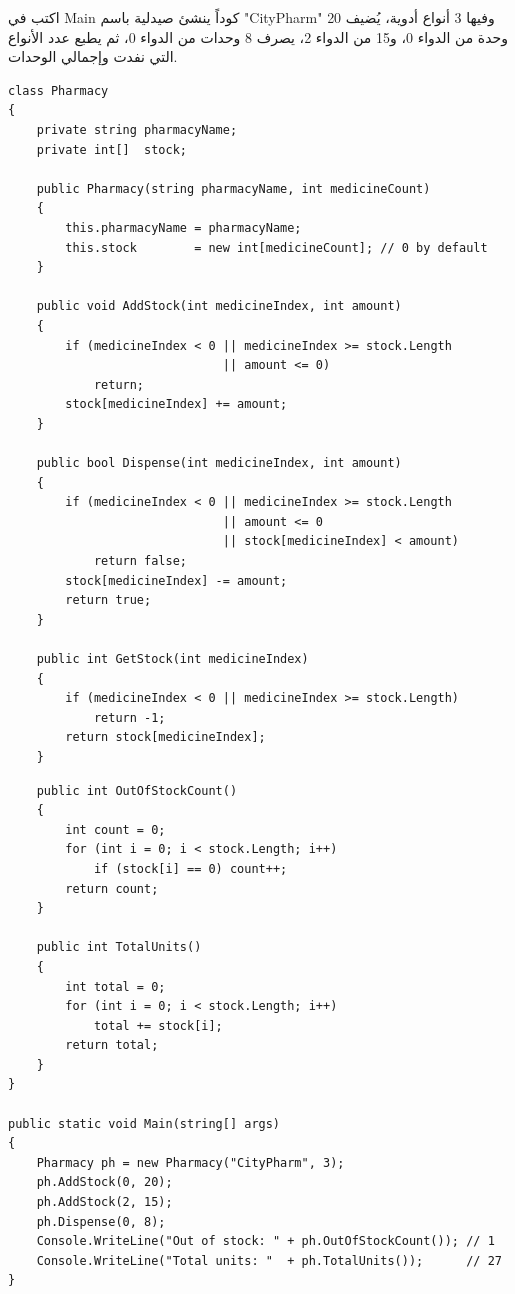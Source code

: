 \documentclass[14pt]{extarticle}
\begin{document}
\begin{enumerate}
اكتب في \textenglish{Main} كوداً ينشئ صيدلية باسم \textenglish{"CityPharm"} وفيها 3 أنواع أدوية،
يُضيف 20 وحدة من الدواء 0، و15 من الدواء 2،
يصرف 8 وحدات من الدواء 0،
ثم يطبع عدد الأنواع التي نفدت وإجمالي الوحدات.

\ifwithsols
{\small
\begin{boxSolution}
\begin{english}
\begin{verbatim}
class Pharmacy
{
    private string pharmacyName;
    private int[]  stock;

    public Pharmacy(string pharmacyName, int medicineCount)
    {
        this.pharmacyName = pharmacyName;
        this.stock        = new int[medicineCount]; // 0 by default
    }

    public void AddStock(int medicineIndex, int amount)
    {
        if (medicineIndex < 0 || medicineIndex >= stock.Length
                              || amount <= 0)
            return;
        stock[medicineIndex] += amount;
    }

    public bool Dispense(int medicineIndex, int amount)
    {
        if (medicineIndex < 0 || medicineIndex >= stock.Length
                              || amount <= 0
                              || stock[medicineIndex] < amount)
            return false;
        stock[medicineIndex] -= amount;
        return true;
    }

    public int GetStock(int medicineIndex)
    {
        if (medicineIndex < 0 || medicineIndex >= stock.Length)
            return -1;
        return stock[medicineIndex];
    }
\end{verbatim}
\end{english}
\end{boxSolution}
\begin{boxSolution}
\begin{english}
\begin{verbatim}
    public int OutOfStockCount()
    {
        int count = 0;
        for (int i = 0; i < stock.Length; i++)
            if (stock[i] == 0) count++;
        return count;
    }

    public int TotalUnits()
    {
        int total = 0;
        for (int i = 0; i < stock.Length; i++)
            total += stock[i];
        return total;
    }
}

public static void Main(string[] args)
{
    Pharmacy ph = new Pharmacy("CityPharm", 3);
    ph.AddStock(0, 20);
    ph.AddStock(2, 15);
    ph.Dispense(0, 8);
    Console.WriteLine("Out of stock: " + ph.OutOfStockCount()); // 1
    Console.WriteLine("Total units: "  + ph.TotalUnits());      // 27
}
\end{verbatim}
\end{english}
\end{boxSolution}
}
\fi
\clearpage


\end{enumerate}
\end{document}
